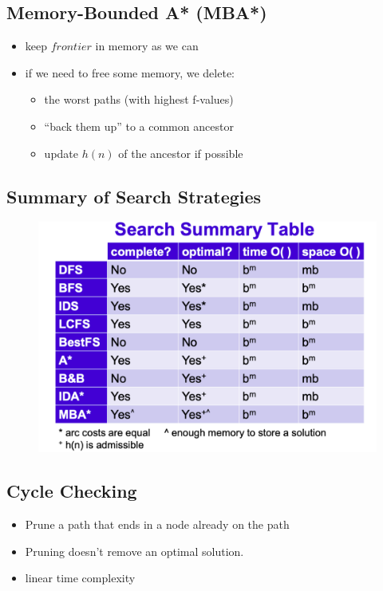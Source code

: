 \documentclass{article}
\begin{document}
\subsection{Memory-Bounded A* (MBA*)}

\begin{itemize}
    \item keep $frontier$ in memory as we can
    \item if we need to free some memory, we delete:
        \begin{itemize}
            \item the worst paths (with highest f-values)
            \item ``back them up'' to a common ancestor
            \item update $h(n)$ of the ancestor if possible
        \end{itemize}
\end{itemize}

\subsection{Summary of Search Strategies}

\begin{figure}[H]
    \includegraphics[width=\textwidth]{summary_of_search_strategies}
    \centering
\end{figure}

\subsection{Cycle Checking}

\begin{itemize}
    \item Prune a path that ends in a node already on the path
    \item Pruning doesn't remove an optimal solution.
    \item linear time complexity
\end{itemize}
\end{document}
